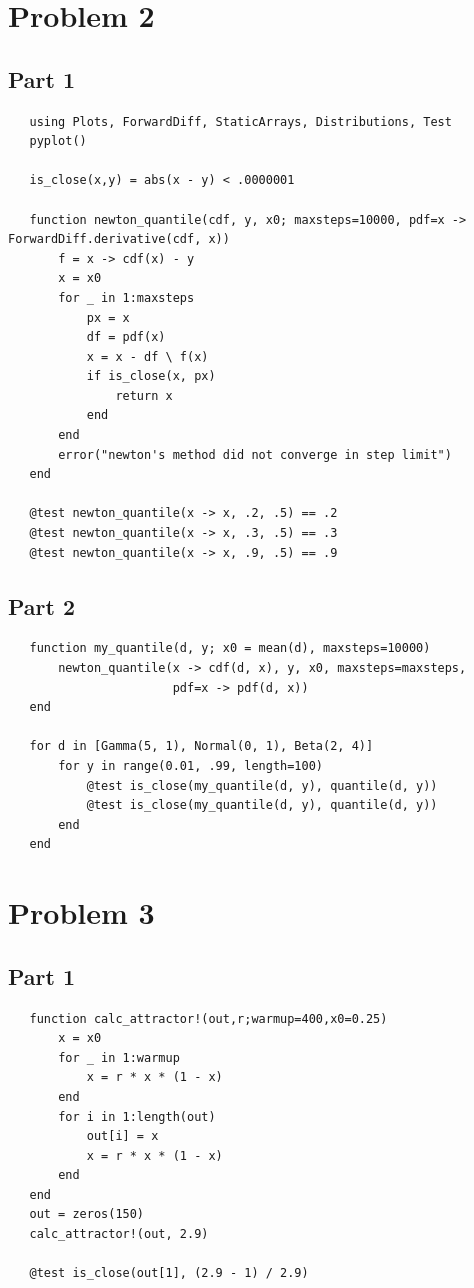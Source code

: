 \documentclass[nobib]{tufte-handout}
\begin{document}
\newpage
\section{Problem 2}
\label{sec:org043a819}
\subsection{Part 1}
\label{sec:org4bcbce0}
\begin{verbatim}
   using Plots, ForwardDiff, StaticArrays, Distributions, Test
   pyplot()

   is_close(x,y) = abs(x - y) < .0000001

   function newton_quantile(cdf, y, x0; maxsteps=10000, pdf=x -> ForwardDiff.derivative(cdf, x))
       f = x -> cdf(x) - y
       x = x0
       for _ in 1:maxsteps
           px = x
           df = pdf(x)
           x = x - df \ f(x)
           if is_close(x, px)
               return x
           end
       end
       error("newton's method did not converge in step limit")
   end

   @test newton_quantile(x -> x, .2, .5) == .2
   @test newton_quantile(x -> x, .3, .5) == .3
   @test newton_quantile(x -> x, .9, .5) == .9
\end{verbatim}

\subsection{Part 2}
\label{sec:org1b6fadf}
\begin{verbatim}
   function my_quantile(d, y; x0 = mean(d), maxsteps=10000)
       newton_quantile(x -> cdf(d, x), y, x0, maxsteps=maxsteps,
                       pdf=x -> pdf(d, x))
   end

   for d in [Gamma(5, 1), Normal(0, 1), Beta(2, 4)]
       for y in range(0.01, .99, length=100)
           @test is_close(my_quantile(d, y), quantile(d, y))
           @test is_close(my_quantile(d, y), quantile(d, y))
       end
   end
\end{verbatim}

\newpage
\section{Problem 3}
\label{sec:org9de8a01}
\subsection{Part 1}
\label{sec:org100afe3}
\begin{verbatim}
   function calc_attractor!(out,r;warmup=400,x0=0.25)
       x = x0
       for _ in 1:warmup
           x = r * x * (1 - x)
       end
       for i in 1:length(out)
           out[i] = x
           x = r * x * (1 - x)
       end
   end
   out = zeros(150)
   calc_attractor!(out, 2.9)

   @test is_close(out[1], (2.9 - 1) / 2.9)
\end{verbatim}
\end{document}
